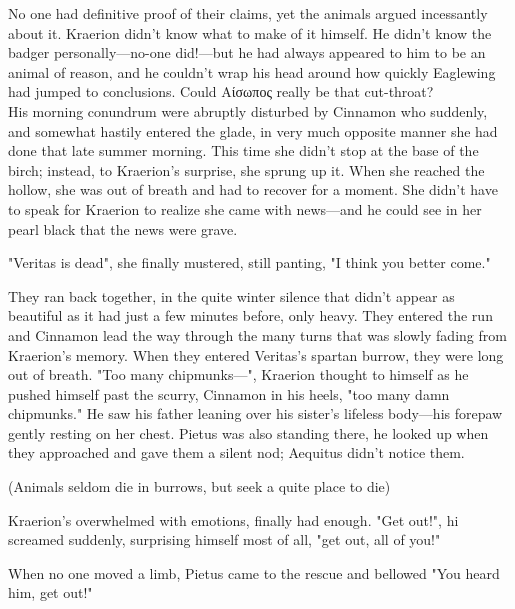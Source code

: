 No one had definitive proof of their claims, yet the animals argued incessantly about it. Kraerion didn't know what to make of it himself. He didn't know the badger personally---no-one did!---but he had always appeared to him to be an animal of reason, and he couldn't wrap his head around how quickly Eaglewing had jumped to conclusions. Could Αίσωπος really be that cut-throat?\\

His morning conundrum were abruptly disturbed by Cinnamon who suddenly, and somewhat hastily entered the glade, in very much opposite manner she had done that late summer morning. This time she didn't stop at the base of the birch; instead, to Kraerion's surprise, she sprung up it. When she reached the hollow, she was out of breath and had to recover for a moment. She didn't have to speak for Kraerion to realize she came with news---and he could see in her pearl black that the news were grave.

"Veritas is dead", she finally mustered, still panting, "I think you better come."

They ran back together, in the quite winter silence that didn't appear as beautiful as it had just a few minutes before, only heavy. They entered the run and Cinnamon lead the way through the many turns that was slowly fading from Kraerion's memory. When they entered Veritas's spartan burrow, they were long out of breath. "Too many chipmunks---", Kraerion thought to himself as he pushed himself past the scurry, Cinnamon in his heels, "too many damn chipmunks." He saw his father leaning over his sister's lifeless body---his forepaw gently resting on her chest. Pietus was also standing there, he looked up when they approached and gave them a silent nod; Aequitus didn't notice them.

(Animals seldom die in burrows, but seek a quite place to die)

Kraerion's overwhelmed with emotions, finally had enough. 
"Get out!", hi screamed suddenly, surprising himself most of all, "get out, all of you!" 

When no one moved a limb, Pietus came to the rescue and bellowed "You heard him, get out!"

